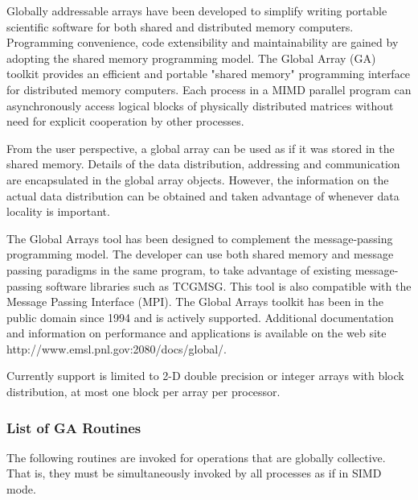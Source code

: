 \label{sec:ga}

%

Globally addressable arrays have been developed to simplify writing
portable scientific software for both shared and distributed memory
computers.  Programming convenience, code extensibility and
maintainability are gained by adopting the shared memory programming
model.  The Global Array (GA) toolkit provides an efficient and portable 
"shared memory" programming interface for distributed memory computers.
Each process in a MIMD parallel program can asynchronously access
logical blocks of physically distributed matrices without need for
explicit cooperation by other processes. 

From the user perspective, a global array can be used as if it was stored
in the shared memory. Details of the data distribution, addressing and
communication are encapsulated in the global array objects. However,
the information on the actual data distribution can be obtained and
taken advantage of whenever data locality is important.

The Global Arrays tool has been designed to complement the message-passing 
programming model.  The developer can use both shared memory and message
passing paradigms in the same program, to take advantage of existing
message-passing software libraries such as TCGMSG.  This tool is also 
compatible with the Message Passing Interface (MPI).  The Global Arrays toolkit
has been in the public domain since 1994 and is actively supported.  Additional
documentation and information on performance and applications is available
on the web site http://www.emsl.pnl.gov:2080/docs/global/.

Currently support is limited to 2-D double precision or integer arrays
with block distribution, at most one block per array per processor.

\subsubsection{List of GA Routines}

The following routines are invoked for operations that are globally collective.
That is, they must be
simultaneously invoked by all processes as if in SIMD mode.

